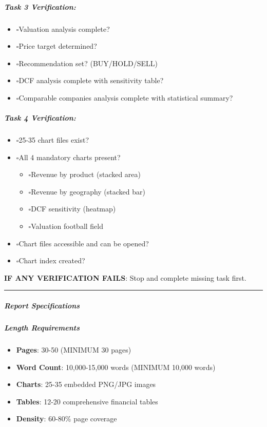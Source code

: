 \documentclass[11pt]{article}
\newcommand{\UncheckedBox}{$\square$}
\begin{document}
\subparagraph{Task 3 Verification:}\mbox{}\par
\begin{itemize}[leftmargin=*,itemsep=2pt,topsep=2pt]
\item {} \UncheckedBox Valuation analysis complete?
\item {} \UncheckedBox Price target determined?
\item {} \UncheckedBox Recommendation set? (BUY/HOLD/SELL)
\item {} \UncheckedBox DCF analysis complete with sensitivity table?
\item {} \UncheckedBox Comparable companies analysis complete with statistical summary?
\end{itemize}

\subparagraph{Task 4 Verification:}\mbox{}\par
\begin{itemize}[leftmargin=*,itemsep=2pt,topsep=2pt]
\item {} \UncheckedBox 25-35 chart files exist?
\item {} \UncheckedBox All 4 mandatory charts present?
\begin{itemize}[leftmargin=*,itemsep=2pt,topsep=2pt]
\item {} \UncheckedBox Revenue by product (stacked area)
\item {} \UncheckedBox Revenue by geography (stacked bar)
\item {} \UncheckedBox DCF sensitivity (heatmap)
\item {} \UncheckedBox Valuation football field
\end{itemize}
\item {} \UncheckedBox Chart files accessible and can be opened?
\item {} \UncheckedBox Chart index created?
\end{itemize}

\textbf{IF ANY VERIFICATION FAILS}: Stop and complete missing task first.


\vspace{0.5em}\hrule\vspace{0.5em}

\subparagraph{Report Specifications}\mbox{}\par

\subparagraph{Length Requirements}\mbox{}\par
\begin{itemize}[leftmargin=*,itemsep=2pt,topsep=2pt]
\item {} \textbf{Pages}: 30-50 (MINIMUM 30 pages)
\item {} \textbf{Word Count}: 10,000-15,000 words (MINIMUM 10,000 words)
\item {} \textbf{Charts}: 25-35 embedded PNG/JPG images
\item {} \textbf{Tables}: 12-20 comprehensive financial tables
\item {} \textbf{Density}: 60-80\% page coverage
\end{itemize}
\end{document}
